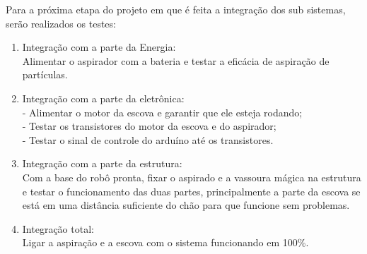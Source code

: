 Para a próxima etapa do projeto em que é feita a integração dos sub sistemas, serão realizados os testes:
\begin{enumerate}
	\item Integração com a parte da Energia: \\ Alimentar o aspirador com a bateria e testar a eficácia de aspiração de partículas.
	\item Integração com a parte da eletrônica: \\ - Alimentar o motor da escova e garantir que ele esteja rodando; \\ - Testar os transistores do motor da escova e do aspirador; \\ - Testar o sinal de controle do arduíno até os transistores.
	\item Integração com a parte da estrutura: \\ Com a base do robô pronta, fixar o aspirado e a vassoura mágica na estrutura e testar o funcionamento das duas partes, principalmente a parte da escova se está em uma distância suficiente do chão para que funcione sem problemas.
	\item Integração total: \\ Ligar a aspiração e a escova com o sistema funcionando em 100\%.
\end{enumerate}
